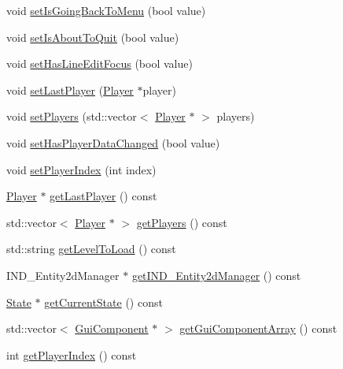 \begin{DoxyCompactItemize}
\item 
void \hyperlink{class_symp_1_1_menu_manager_af81f00489117749ab084064b6a386166}{set\-Is\-Going\-Back\-To\-Menu} (bool value)
\item 
void \hyperlink{class_symp_1_1_menu_manager_a6bac0d174a5b3af95df602c7d5f36b02}{set\-Is\-About\-To\-Quit} (bool value)
\item 
void \hyperlink{class_symp_1_1_menu_manager_ae02940a8786e8959fe45a8b48bb3dfb8}{set\-Has\-Line\-Edit\-Focus} (bool value)
\item 
void \hyperlink{class_symp_1_1_menu_manager_a31bad57ff718192aab5aa951d809ce8f}{set\-Last\-Player} (\hyperlink{class_symp_1_1_player}{Player} $\ast$player)
\item 
void \hyperlink{class_symp_1_1_menu_manager_aa08c2c34c8dc95199f5250e87aeaf13d}{set\-Players} (std\-::vector$<$ \hyperlink{class_symp_1_1_player}{Player} $\ast$ $>$ players)
\item 
void \hyperlink{class_symp_1_1_menu_manager_a269895498ed2ed92ead3b9e628e8ce98}{set\-Has\-Player\-Data\-Changed} (bool value)
\item 
void \hyperlink{class_symp_1_1_menu_manager_aa686e7c72abd63486a6ce3d5a236fc34}{set\-Player\-Index} (int index)
\item 
\hyperlink{class_symp_1_1_player}{Player} $\ast$ \hyperlink{class_symp_1_1_menu_manager_a086e53a1c9799b72a0fc8606549a4824}{get\-Last\-Player} () const 
\item 
std\-::vector$<$ \hyperlink{class_symp_1_1_player}{Player} $\ast$ $>$ \hyperlink{class_symp_1_1_menu_manager_a464da67bcfec32b635d160a29520522b}{get\-Players} () const 
\item 
std\-::string \hyperlink{class_symp_1_1_menu_manager_a51fa8c805528a8a4bd2e834df3f99ad3}{get\-Level\-To\-Load} () const 
\item 
I\-N\-D\-\_\-\-Entity2d\-Manager $\ast$ \hyperlink{class_symp_1_1_menu_manager_a8fe8763dd656f9a149d009883437fa90}{get\-I\-N\-D\-\_\-\-Entity2d\-Manager} () const 
\item 
\hyperlink{class_symp_1_1_state}{State} $\ast$ \hyperlink{class_symp_1_1_menu_manager_a3c0bbc01aff2632a73bfb4183e485b24}{get\-Current\-State} () const 
\item 
std\-::vector$<$ \hyperlink{class_symp_1_1_gui_component}{Gui\-Component} $\ast$ $>$ \hyperlink{class_symp_1_1_menu_manager_a61f93678d0dbaa5408d3904912a59b7f}{get\-Gui\-Component\-Array} () const 
\item 
int \hyperlink{class_symp_1_1_menu_manager_ad289f68533ee5e1d24b3d6f203aef159}{get\-Player\-Index} () const 

\end{DoxyCompactItemize}
